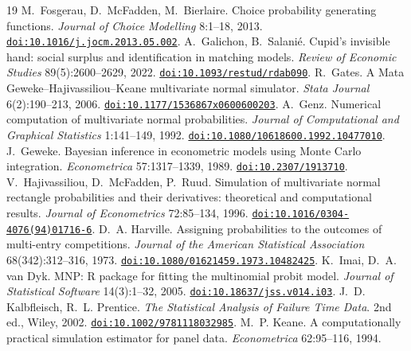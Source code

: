 \documentclass[11pt]{article}
\begin{document}
\begin{thebibliography}{19}
M.~Fosgerau, D.~McFadden, M.~Bierlaire. Choice probability generating
functions. \emph{Journal of Choice Modelling} 8:1--18, 2013.
\href{https://doi.org/10.1016/j.jocm.2013.05.002}{\nolinkurl{doi:10.1016/j.jocm.2013.05.002}}.
 A.~Galichon,
B.~Salani\'e. Cupid's invisible hand: social surplus and identification in
matching models. \emph{Review of Economic Studies} 89(5):2600--2629, 2022.
\href{https://doi.org/10.1093/restud/rdab090}{\nolinkurl{doi:10.1093/restud/rdab090}}.
 R.~Gates.
A Mata Geweke--Hajivassiliou--Keane multivariate normal simulator.
\emph{Stata Journal} 6(2):190--213, 2006.
\href{https://doi.org/10.1177/1536867x0600600203}{\nolinkurl{doi:10.1177/1536867x0600600203}}.
 A.~Genz.
Numerical computation of multivariate normal probabilities.
\emph{Journal of Computational and Graphical Statistics} 1:141--149, 1992.
\href{https://doi.org/10.1080/10618600.1992.10477010}{\nolinkurl{doi:10.1080/10618600.1992.10477010}}.
 J.~Geweke.
Bayesian inference in econometric models using Monte Carlo integration.
\emph{Econometrica} 57:1317--1339, 1989.
\href{https://doi.org/10.2307/1913710}{\nolinkurl{doi:10.2307/1913710}}.
 V.~Hajivassiliou,
D.~McFadden, P.~Ruud. Simulation of multivariate normal rectangle probabilities
and their derivatives: theoretical and computational results.
\emph{Journal of Econometrics} 72:85--134, 1996.
\href{https://doi.org/10.1016/0304-4076(94)01716-6}{\nolinkurl{doi:10.1016/0304-4076(94)01716-6}}.
 D.~A. Harville. Assigning
probabilities to the outcomes of multi-entry competitions.
\emph{Journal of the American Statistical Association}
68(342):312--316, 1973.
\href{https://doi.org/10.1080/01621459.1973.10482425}{\nolinkurl{doi:10.1080/01621459.1973.10482425}}.
 K.~Imai, D.~A. van Dyk.
MNP: R package for fitting the multinomial probit model.
\emph{Journal of Statistical Software} 14(3):1--32, 2005.
\href{https://doi.org/10.18637/jss.v014.i03}{\nolinkurl{doi:10.18637/jss.v014.i03}}.
J.~D. Kalbfleisch, R.~L. Prentice. \emph{The Statistical Analysis of
Failure Time Data}. 2nd ed., Wiley, 2002.
\href{https://doi.org/10.1002/9781118032985}{\nolinkurl{doi:10.1002/9781118032985}}.
 M.~P. Keane.
A computationally practical simulation estimator for panel data.
\emph{Econometrica} 62:95--116, 1994.

\end{thebibliography}
\end{document}
